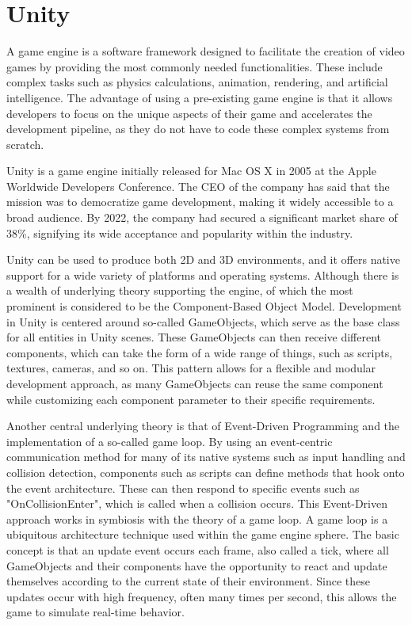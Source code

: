 \section{Unity}

A game engine is a software framework designed to facilitate the creation of video games by providing the most commonly needed functionalities. These include complex tasks such as physics calculations, animation, rendering, and artificial intelligence. The advantage of using a pre-existing game engine is that it allows developers to focus on the unique aspects of their game and accelerates the development pipeline, as they do not have to code these complex systems from scratch.

Unity is a game engine initially released for Mac OS X in 2005 at the Apple Worldwide Developers Conference\cite{macworld2005}. The CEO of the company has said that the mission was to democratize game development, making it widely accessible to a broad audience\cite{polygon2014}. By 2022, the company had secured a significant market share of 38\%, signifying its wide acceptance and popularity within the industry\cite{slashdata2022}.

Unity can be used to produce both 2D and 3D environments, and it offers native support for a wide variety of platforms and operating systems. Although there is a wealth of underlying theory supporting the engine, of which the most prominent is considered to be the Component-Based Object Model. Development in Unity is centered around so-called GameObjects, which serve as the base class for all entities in Unity scenes. These GameObjects can then receive different components, which can take the form of a wide range of things, such as scripts, textures, cameras, and so on. This pattern allows for a flexible and modular development approach, as many GameObjects can reuse the same component while customizing each component parameter to their specific requirements.

Another central underlying theory is that of Event-Driven Programming and the implementation of a so-called game loop\cite{gameprogrammingpatterns2023}. By using an event-centric communication method for many of its native systems such as input handling and collision detection, components such as scripts can define methods that hook onto the event architecture. These can then respond to specific events such as "OnCollisionEnter", which is called when a collision occurs\cite{unityManualExecutionOrder2023}\cite{unityManualEventFunctions2023}. This Event-Driven approach works in symbiosis with the theory of a game loop. A game loop is a ubiquitous architecture technique used within the game engine sphere. The basic concept is that an update event occurs each frame, also called a tick, where all GameObjects and their components have the opportunity to react and update themselves according to the current state of their environment. Since these updates occur with high frequency, often many times per second, this allows the game to simulate real-time behavior.

